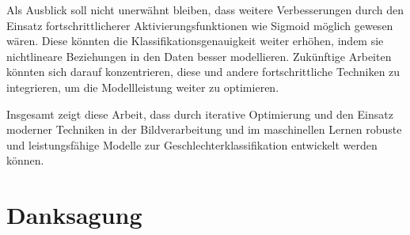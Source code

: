 \documentclass[journal,twoside,web]{ieeecolor}
\begin{document}
Als Ausblick soll nicht unerwähnt bleiben, dass weitere Verbesserungen durch den Einsatz fortschrittlicherer Aktivierungsfunktionen wie Sigmoid möglich gewesen wären. Diese könnten die Klassifikationsgenauigkeit weiter erhöhen, indem sie nichtlineare Beziehungen in den Daten besser modellieren. Zukünftige Arbeiten könnten sich darauf konzentrieren, diese und andere fortschrittliche Techniken zu integrieren, um die Modellleistung weiter zu optimieren.

Insgesamt zeigt diese Arbeit, dass durch iterative Optimierung und den Einsatz moderner Techniken in der Bildverarbeitung und im maschinellen Lernen robuste und leistungsfähige Modelle zur Geschlechterklassifikation entwickelt werden können.






\appendices


\section*{Danksagung}
\end{document}
